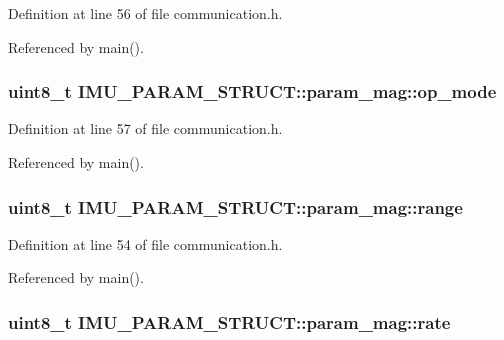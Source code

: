 Definition at line 56 of file communication.\-h.



Referenced by main().

\hypertarget{structIMU__PARAM__STRUCT_1_1param__mag_a39b83b3e9ff5bdcafed0bdf6a2de584b}{
\subsubsection[{op\-\_\-mode}]{\setlength{\rightskip}{0pt plus 5cm}uint8\-\_\-t I\-M\-U\-\_\-\-P\-A\-R\-A\-M\-\_\-\-S\-T\-R\-U\-C\-T\-::param\-\_\-mag\-::op\-\_\-mode}}\label{structIMU__PARAM__STRUCT_1_1param__mag_a39b83b3e9ff5bdcafed0bdf6a2de584b}


Definition at line 57 of file communication.\-h.



Referenced by main().

\hypertarget{structIMU__PARAM__STRUCT_1_1param__mag_a40ad27ebdb5fde35257b1dc52e40f476}{
\subsubsection[{range}]{\setlength{\rightskip}{0pt plus 5cm}uint8\-\_\-t I\-M\-U\-\_\-\-P\-A\-R\-A\-M\-\_\-\-S\-T\-R\-U\-C\-T\-::param\-\_\-mag\-::range}}\label{structIMU__PARAM__STRUCT_1_1param__mag_a40ad27ebdb5fde35257b1dc52e40f476}


Definition at line 54 of file communication.\-h.



Referenced by main().

\hypertarget{structIMU__PARAM__STRUCT_1_1param__mag_a234de95423b604b05b851ef90890cea1}{
\subsubsection[{rate}]{\setlength{\rightskip}{0pt plus 5cm}uint8\-\_\-t I\-M\-U\-\_\-\-P\-A\-R\-A\-M\-\_\-\-S\-T\-R\-U\-C\-T\-::param\-\_\-mag\-::rate}}\label{structIMU__PARAM__STRUCT_1_1param__mag_a234de95423b604b05b851ef90890cea1}


